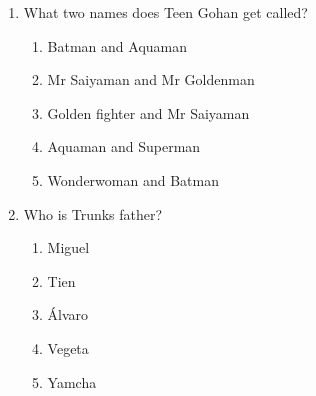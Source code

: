\documentclass[letterpaper,addpoints,answers,twocolumn,10pt]{exam}
\begin{document}
\begin{enumerate}[leftmargin=.2in]
\begin{enumerate}[noitemsep,leftmargin=0in]
\end{enumerate}



\item  What two names does Teen Gohan get called?


\begin{enumerate}[noitemsep,leftmargin=0in]


\item  Batman and Aquaman
\item  Mr Saiyaman and Mr Goldenman
\item  Golden fighter and Mr Saiyaman
\item  Aquaman and Superman
\item  Wonderwoman and Batman


\end{enumerate}



\item  Who is Trunks father?


\begin{enumerate}[noitemsep,leftmargin=0in]


\item  Miguel
\item  Tien
\item  Álvaro
\item  Vegeta
\item  Yamcha


\end{enumerate}



\end{enumerate}
\end{document}
